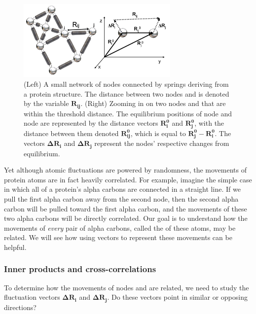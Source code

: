 \begin{figure}[h]
	\centering
	\mySfFamily
	\includegraphics[width = 0.7\textwidth]{../images/gaussian_fluctuations.png}
	\caption{(Left) A small network of nodes connected by springs deriving from a protein structure. The distance between two nodes  and  is denoted by the variable $\textbf{R}_\textbf{ij}$. (Right) Zooming in on two nodes  and  that are within the threshold distance. The equilibrium positions of node  and node  are represented by the distance vectors $ \textbf{R}_\textbf{i}^\textbf{0} $ and $\textbf{R}_\textbf{j}^\textbf{0}$, with the distance between them denoted $\textbf{R}_{\textbf{ij}}^\textbf{0}$, which is equal to $\textbf{R}_\textbf{j}^\textbf{0} - \textbf{R}_\textbf{i}^\textbf{0}$. The vectors $\mathbf{\Delta} \textbf{R}_\textbf{i} $ and $ \mathbf{\Delta} \textbf{R}_\textbf{j}$ represent the nodes' respective changes from equilibrium.}
	\label{fig:gaussian_fluctuations}
\end{figure}

Yet although atomic fluctuations are powered by randomness, the movements of protein atoms are in fact heavily correlated. For example, imagine the simple case in which all of a protein's alpha carbons are connected in a straight line. If we pull the first alpha carbon away from the second node, then the second alpha carbon will be pulled toward the first alpha carbon, and the movements of these two alpha carbons will be directly correlated. Our goal is to understand how the movements of \textit{every} pair of alpha carbons, called the  of these atoms, may be related. We will see how using vectors to represent these movements can be helpful.

\FloatBarrier
{}
\subsubsection{Inner products and cross-correlations}

To determine how the movements of nodes  and  are related, we need to study the fluctuation vectors $ \mathbf{\Delta R_i} $ and $\mathbf{\Delta R_j}$. Do these vectors point in similar or opposing directions?

